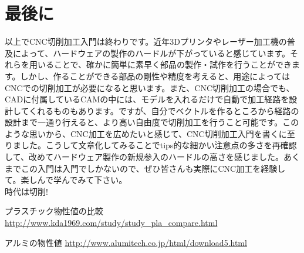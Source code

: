 \documentclass[b5paper, 9pt, twocolumn, titlepage,openany]{jsbook}%
\begin{document}
\clearpage
\chapter*{最後に}
以上でCNC切削加工入門は終わりです。近年3Dプリンタやレーザー加工機の普及によって、ハードウェアの製作のハードルが下がっていると感じています。それらを用いることで、確かに簡単に素早く部品の製作・試作を行うことができます。しかし、作ることができる部品の剛性や精度を考えると、用途によってはCNCでの切削加工が必要になると思います。また、CNC切削加工の場合でも、CADに付属しているCAMの中には、モデルを入れるだけで自動で加工経路を設計してくれるものもあります。ですが、自分でベクトルを作るところから経路の設計まで一通り行えると、より高い自由度で切削加工を行うこと可能です。このような思いから、CNC加工を広めたいと感じて、CNC切削加工入門を書くに至りました。こうして文章化してみることでtips的な細かい注意点の多さを再確認して、改めてハードウェア製作の新規参入のハードルの高さを感じました。あくまでこの入門は入門でしかないので、ぜひ皆さんも実際にCNC加工を経験して。楽しんで学んでみて下さい。\\時代は切削!

\begin{thebibliography}{99} %

プラスチック物性値の比較 \url{http://www.kda1969.com/study/study_pla_compare.html}

アルミの物性値 \url{http://www.alumitech.co.jp/html/download5.html}

\end{thebibliography}
\end{document}
